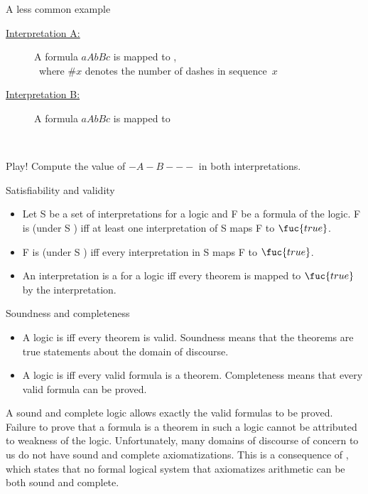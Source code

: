 \documentclass{beamer}
\def\true{\fuc{true}}
\begin{document}
\begin{slide}{A less common example}

\begin{description}
\item[\underline{Interpretation A:}] A formula $a A b B c$ is mapped to  , \\{~\!\!\!\!}where $\#x$ denotes the number of dashes in sequence~$x$
\item[\underline{Interpretation B:}] A formula $a A b B c$ is mapped to  %
\end{description}

~\\[1mm]

\begin{block}{Play!}
Compute the value  of $-A-B---$ in both interpretations.
\end{block}
\end{slide} 





\begin{slide}{Satisfiability and validity}
\begin{itemize}
\item Let S be a set of interpretations for a logic and F be a formula of the logic. F is  (under S ) iff at least one interpretation of S maps F to $\true$.
\item  F is  (under S ) iff every interpretation in S maps F to $\true$.
\item An interpretation is a  for a logic iff every theorem is mapped to $\true$ by the interpretation. 
\end{itemize}
\end{slide} 

\begin{slide}{Soundness and completeness }
\begin{itemize}
\item A logic is  iff every theorem is valid. Soundness means that the theorems are true statements about the domain of discourse. 
\item A logic is  iff every valid formula is a theorem. Completeness means that every valid formula can be proved.
\end{itemize}

A sound and complete logic allows exactly the valid formulas to be proved. Failure to prove that a formula is a theorem in such a logic cannot be attributed to weakness of the logic. Unfortunately, many domains of discourse of concern to us  do not have sound and complete axiomatizations. This is a consequence of , which states that no formal logical system that axiomatizes arithmetic can be both sound and complete. 
\end{slide} 
\end{document}
